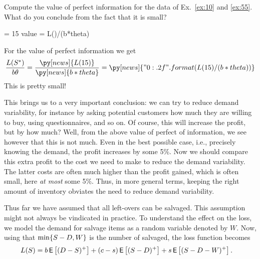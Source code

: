 \begin{exercise}
Compute the value of perfect information for the data of Ex.~\ref{ex:10} and \ref{ex:55}. What do you conclude from the fact that it is small?
\begin{solution}
\begin{pycode}[news]
\Qstar = 15
value = L(\Qstar)/(b*theta)
\end{pycode}
For the value of perfect information we get
\begin{equation*}
 \frac{L(\Q^*)}{b \theta} = \frac{\py[news]{L(15)}}{\py[news]{b*theta}} = 
\py[news]{"{0:.2f}".format(L(15)/(b*theta))}
\end{equation*}
This is pretty small! 

This brings us to a very important conclusion: we can try to reduce  demand variability, for instance  by asking potential customers how much they are willing to buy, using questionnaires, and so on. Of course, this will increase the profit, but by how much? Well, from the above value of perfect of information, we see however that this is not much. Even in the best possible case, i.e., precisely knowing the demand, the profit increases by some 5\%. Now we should compare this extra profit to the cost we need to make to reduce the demand variability. The latter costs are often much higher than the profit gained, which is often small, here \emph{at most} some 5\%. Thus, in more general terms, keeping the right amount of inventory obviates the need to reduce demand variability.
\end{solution}
\end{exercise}

Thus far we have assumed that all left-overs can be salvaged. This assumption might not always be vindicated in practice. To understand the effect on the loss, we model the demand for salvage items as a random variable denoted by $W$. Now, using that  $\min\{S-D, W\}$ is the number of  salvaged, the loss function becomes
\begin{align*}
L(S) 
 &= b\,\mathsf{E}\left[(D-S)^+\right] + (c-s) \,\mathsf{E}\left[(S-D)^+\right] + s \,\mathsf{E}\left[(S-D- W)^+\right].
\end{align*}

